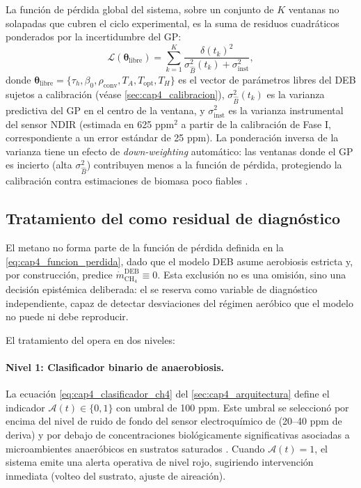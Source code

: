 La función de pérdida global del sistema, sobre un conjunto de $K$ ventanas no solapadas que cubren el ciclo experimental, es la suma de residuos cuadráticos ponderados por la incertidumbre del GP:
\begin{equation}
    \label{eq:cap4_funcion_perdida}
    \mathcal{L}(\boldsymbol{\theta}_{\mathrm{libre}}) =
    \sum_{k=1}^{K}
    \frac{\delta(t_k)^{2}}{\sigma^{2}_{\hat{B}}(t_k) + \sigma^{2}_{\mathrm{inst}}},
\end{equation}
donde $\boldsymbol{\theta}_{\mathrm{libre}} = \{\tau_h, \beta_0, \rho_{\mathrm{conv}}, T_A, T_{\mathrm{opt}}, T_H\}$ es el vector de parámetros libres del DEB sujetos a calibración (véase \cref{sec:cap4_calibracion}), $\sigma^{2}_{\hat{B}}(t_k)$ es la varianza predictiva del GP en el centro de la ventana, y $\sigma^{2}_{\mathrm{inst}}$ es la varianza instrumental del sensor NDIR (estimada en \num{625} ppm$^2$ a partir de la calibración de Fase I, correspondiente a un error estándar de \num{25} ppm). La ponderación inversa de la varianza tiene un efecto de \emph{down-weighting} automático: las ventanas donde el GP es incierto (alta $\sigma^{2}_{\hat{B}}$) contribuyen menos a la función de pérdida, protegiendo la calibración contra estimaciones de biomasa poco fiables \parencite{biagiDevelopmentMachineLearningbased2024}.

\subsection{Tratamiento del  como residual de diagnóstico}
\label{subsec:cap4_tratamiento_ch4}

El metano no forma parte de la función de pérdida definida en la \cref{eq:cap4_funcion_perdida}, dado que el modelo DEB asume aerobiosis estricta y, por construcción, predice $\dot{m}_{\mathrm{CH_4}}^{\mathrm{DEB}} \equiv 0$. Esta exclusión no es una omisión, sino una decisión epistémica deliberada: el  se reserva como variable de diagnóstico independiente, capaz de detectar desviaciones del régimen aeróbico que el modelo no puede ni debe reproducir.

El tratamiento del  opera en dos niveles:

\paragraph{Nivel 1: Clasificador binario de anaerobiosis.}
La ecuación \eqref{eq:cap4_clasificador_ch4} del \cref{sec:cap4_arquitectura} define el indicador $\mathcal{A}(t) \in \{0, 1\}$ con umbral de \num{100} ppm. Este umbral se seleccionó por encima del nivel de ruido de fondo del sensor electroquímico de  (\num{20}--\num{40} ppm de deriva) y por debajo de concentraciones biológicamente significativas asociadas a microambientes anaeróbicos en sustratos saturados \parencite{bekkerImpactSubstrateMoisture2021}. Cuando $\mathcal{A}(t) = 1$, el sistema emite una alerta operativa de nivel rojo, sugiriendo intervención inmediata (volteo del sustrato, ajuste de aireación).

